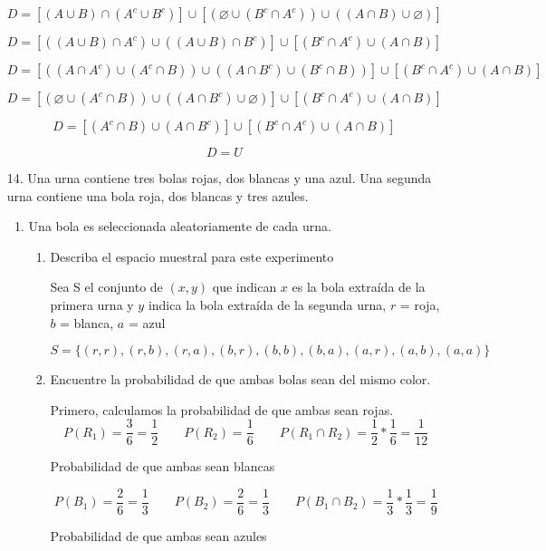 \documentclass[letterpaper,11pt]{article}
\renewcommand{%
	\contentsname}{\vspace{-1cm} \hfill\bfseries\LARGE Índice \hfill \vspace{0.2cm}%
}
\begin{document}
\begin{enumerate}
$$
D= [(A \cup B) \cap (A^c \cup B^c)] \cup [( \varnothing  \cup (B^c \cap A^c) ) \cup 
((A \cap B) \cup \varnothing )]
$$

$$
D= [((A \cup B) \cap A^c) \cup ((A \cup B) \cap B^c) ] \cup [ (B^c \cap A^c) \cup 
(A \cap B)]
$$

$$
D= [((A \cap A^c) \cup (A^c \cap B)) \cup ((A \cap B^c) \cup (B^c \cap B)) ] \cup [ (B^c \cap A^c) \cup (A \cap B)]
$$

$$
D= [(\varnothing \cup (A^c \cap B)) \cup ((A \cap B^c) \cup \varnothing) ] \cup [ (B^c \cap A^c) \cup (A \cap B)]
$$

$$
D= [(A^c \cap B) \cup (A \cap B^c) ] \cup [ (B^c \cap A^c) \cup (A \cap B)]
$$
%


$$
D= U
$$

\item[14.] Una urna contiene tres bolas rojas, dos blancas y una azul. Una segunda urna contiene una bola roja, dos blancas y tres azules. 

\begin{enumerate}
	\item Una bola es seleccionada aleatoriamente de cada urna.
	\begin{enumerate}
		\item Describa el espacio muestral para este experimento
		
		Sea S el conjunto de $(x,y)$ que indican $x$ es la bola extraída de la primera urna y $y$ indica la bola extraída de la segunda urna, $r$ = roja, $b$ = blanca, $a$ = azul

		$$
		S=\{ (r,r), (r,b), (r,a), (b,r), (b,b), (b,a), (a,r), (a,b), (a,a) \}
		$$

		\item Encuentre la probabilidad de que ambas bolas sean del mismo color.
		
		Primero, calculamos la probabilidad de que ambas sean rojas. 
		$$P(R_1)= \frac{3}{6} = \frac{1}{2} \qquad P(R_2) = \frac{1}{6} \qquad P(R_1 \cap R_2)= \frac{1}{2} * \frac{1}{6} = \frac{1}{12} $$

		Probabilidad de que ambas sean blancas

		$$P(B_1)= \frac{2}{6} = \frac{1}{3} \qquad P(B_2) = \frac{2}{6}= \frac{1}{3} \qquad P(B_1 \cap B_2)= \frac{1}{3} * \frac{1}{3} = \frac{1}{9} $$

		Probabilidad de que ambas sean azules


\end{enumerate}
\end{enumerate}
\end{enumerate}
\end{document}
